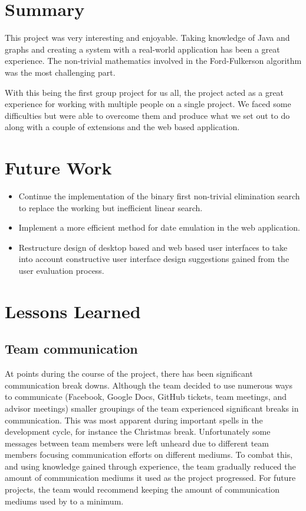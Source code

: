 \section{Summary}

This project was very interesting and enjoyable. Taking knowledge of Java
and graphs and creating a system with a real-world application has been a
great experience. The non-trivial mathematics involved in the Ford-Fulkerson
algorithm was the most challenging part.

With this being the first group project for us all, the project acted as a
great experience for working with multiple people on a single project. We
faced some difficulties but were able to overcome them and produce what we
set out to do along with a couple of extensions and the web based application.

\section{Future Work}

\begin{itemize}
\item Continue the implementation of the binary first non-trivial elimination
search to replace the working but inefficient linear search.
\item Implement a more efficient method for date emulation in the web
application.
\item Restructure design of desktop based and web based user interfaces to
take into account constructive user interface design suggestions gained from
the user evaluation process.
 \end{itemize}

\section{Lessons Learned}

\subsection{Team communication}

At points during the course of the project, there has been significant
communication break downs. Although the team decided to use numerous ways to
communicate (Facebook, Google Docs, GitHub tickets, team meetings, and advisor
meetings) smaller groupings of the team experienced significant breaks in
communication. This was most apparent during important spells in the
development cycle, for instance the Christmas break. Unfortunately some
messages between team members were left unheard due to different team members
focusing communication efforts on different mediums. To combat this, and using
knowledge gained through experience, the team gradually reduced the amount of
communication mediums it used as the project progressed. For future projects,
the team would recommend keeping the amount of communication mediums used by  to
a minimum.

